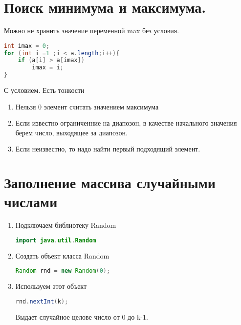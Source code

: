 \documentclass{article}
\begin{document}
\section{Поиск минимума и максимума.}
Можно не хранить значение переменной max без условия.
\begin{lstlisting}[language=Java] 
int imax = 0;
for (int i =1 ;i < a.length;i++){
    if (a[i] > a[imax])
        imax = i;
}
\end{lstlisting} 
С условием. Есть тонкости
\begin{enumerate}
    \item Нельзя 0 элемент считать значением максимума
    \item Если известно ограниченние на диапозон, в качестве начального значения берем число,
        выходящее за диапозон.
    \item Если неизвестно, то надо найти первый подходящий элемент.
\end{enumerate}
\section{Заполнение массива случайными числами}
\begin{enumerate}
    \item Подключаем библиотеку Random
        \begin{lstlisting}[language=Java] 
import java.util.Random 
        \end{lstlisting} 
        \item Создать объект класса Random
\begin{lstlisting}[language=Java] 
Random rnd = new Random(0);
\end{lstlisting} 
\item Используем этот объект
\begin{lstlisting}[language=Java] 
rnd.nextInt(k); 
\end{lstlisting} 
Выдает случайное целове число от 0 до k-1.
\end{enumerate}
\end{document}
